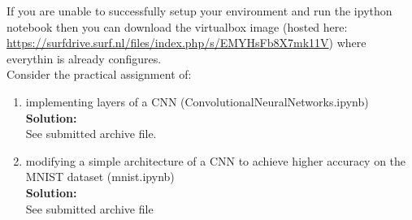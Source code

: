\documentclass[a4paper]{article}
\begin{document}
\begin{enumerate}
If you are unable to successfully setup your environment and run the ipython notebook then you can download the virtualbox image (hosted here: \url{https://surfdrive.surf.nl/files/index.php/s/EMYHsFb8X7mk11V}) where everythin is already configures.\\
Consider the practical assignment of:

\begin{enumerate}
	\item implementing layers of a CNN (ConvolutionalNeuralNetworks.ipynb)\\
	\textbf{Solution:}\\
	See submitted archive file.
	
	
	\item modifying a simple architecture of a CNN to achieve higher accuracy on the MNIST dataset (mnist.ipynb)\\
	\textbf{Solution:}\\
	See submitted archive file
	
\end{enumerate}
	
\end{enumerate}
\end{document}
